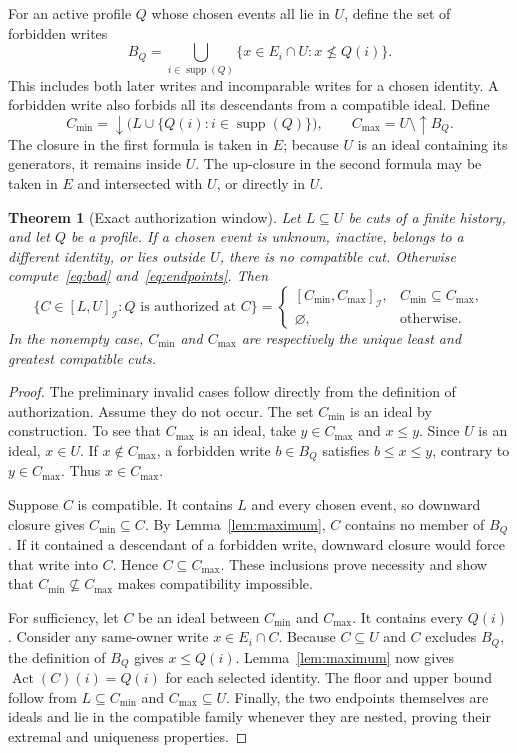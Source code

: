 \documentclass[11pt]{article}
\newtheorem{theorem}{Theorem}[section]
\theoremstyle{definition}
\newcommand{\Id}{\mathcal I}
\newcommand{\Act}{\operatorname{Act}}
\newcommand{\supp}{\operatorname{supp}}
\newcommand{\lo}{C_{\min}}
\newcommand{\hi}{C_{\max}}
\begin{document}
For an active profile $Q$ whose chosen events all lie in $U$, define the set of forbidden writes
\begin{equation}\label{eq:bad}
 B_Q=\bigcup_{i\in\supp(Q)}\{x\in E_i\cap U:x\not\leq Q(i)\}.
\end{equation}
This includes both later writes and incomparable writes for a chosen identity. A forbidden write also forbids all its descendants from a compatible ideal. Define
\begin{equation}\label{eq:endpoints}
 \lo=\downarrow\bigl(L\cup\{Q(i):i\in\supp(Q)\}\bigr),\qquad
 \hi=U\setminus\uparrow B_Q.
\end{equation}
The closure in the first formula is taken in $E$; because $U$ is an ideal containing its generators, it remains inside $U$. The up-closure in the second formula may be taken in $E$ and intersected with $U$, or directly in $U$.

\begin{theorem}[Exact authorization window]\label{thm:window}
Let $L\subseteq U$ be cuts of a finite history, and let $Q$ be a profile. If a chosen event is unknown, inactive, belongs to a different identity, or lies outside $U$, there is no compatible cut. Otherwise compute~\eqref{eq:bad} and~\eqref{eq:endpoints}. Then
\begin{equation}\label{eq:family}
 \{C\in[L,U]_{\Id}:Q\text{ is authorized at }C\}
 =
 \begin{cases}
 [\lo,\hi]_{\Id},&\lo\subseteq\hi,\\
 \varnothing,&\text{otherwise}.
 \end{cases}
\end{equation}
In the nonempty case, $\lo$ and $\hi$ are respectively the unique least and greatest compatible cuts.
\end{theorem}
\begin{proof}
The preliminary invalid cases follow directly from the definition of authorization. Assume they do not occur. The set $\lo$ is an ideal by construction. To see that $\hi$ is an ideal, take $y\in\hi$ and $x\leq y$. Since $U$ is an ideal, $x\in U$. If $x\notin\hi$, a forbidden write $b\in B_Q$ satisfies $b\leq x\leq y$, contrary to $y\in\hi$. Thus $x\in\hi$.

Suppose $C$ is compatible. It contains $L$ and every chosen event, so downward closure gives $\lo\subseteq C$. By Lemma~\ref{lem:maximum}, $C$ contains no member of $B_Q$. If it contained a descendant of a forbidden write, downward closure would force that write into $C$. Hence $C\subseteq\hi$. These inclusions prove necessity and show that $\lo\not\subseteq\hi$ makes compatibility impossible.

For sufficiency, let $C$ be an ideal between $\lo$ and $\hi$. It contains every $Q(i)$. Consider any same-owner write $x\in E_i\cap C$. Because $C\subseteq U$ and $C$ excludes $B_Q$, the definition of $B_Q$ gives $x\leq Q(i)$. Lemma~\ref{lem:maximum} now gives $\Act(C)(i)=Q(i)$ for each selected identity. The floor and upper bound follow from $L\subseteq\lo$ and $\hi\subseteq U$. Finally, the two endpoints themselves are ideals and lie in the compatible family whenever they are nested, proving their extremal and uniqueness properties.
\end{proof}
\end{document}
